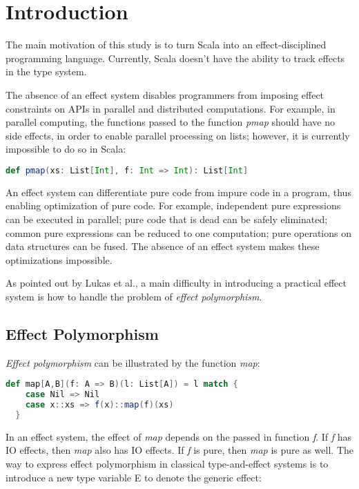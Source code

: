 \section{Introduction}

The main motivation of this study is to turn Scala into an
effect-disciplined programming language. Currently, Scala doesn't have
the ability to track effects in the type system.

The absence of an effect system disables programmers from imposing
effect constraints on APIs in parallel and distributed
computations. For example, in parallel computing, the functions passed
to the function \emph{pmap} should have no side effects, in order to
enable parallel processing on lists; however, it is currently
impossible to do so in Scala:

\begin{lstlisting}[language=Scala]
def pmap(xs: List[Int], f: Int => Int): List[Int]
\end{lstlisting}

An effect system can differentiate pure code from impure code in a
program, thus enabling optimization of pure code. For example,
independent pure expressions can be executed in parallel; pure code
that is dead can be safely eliminated; common pure expressions can be
reduced to one computation; pure operations on data structures can be
fused\cite{coutts2007stream}. The absence of an effect system makes
these optimizations impossible.

As pointed out by Lukas et al.\cite{rytz2012lightweight}, a main
difficulty in introducing a practical effect system is how to handle
the problem of \emph{effect polymorphism}.

\subsection{Effect Polymorphism}

\emph{Effect polymorphism} can be illustrated by the
function \emph{map}:

\begin{lstlisting}[language=Scala]
  def map[A,B](f: A => B)(l: List[A]) = l match {
    case Nil => Nil
    case x::xs => f(x)::map(f)(xs)
  }
\end{lstlisting}

In an effect system, the effect of \emph{map} depends on the passed in
function \emph{f}. If \emph{f} has IO effects, then \emph{map} also
has IO effects. If \emph{f} is pure, then \emph{map} is pure as
well. The way to express effect polymorphism in classical
type-and-effect systems is to introduce a new type variable E to
denote the generic effect:

